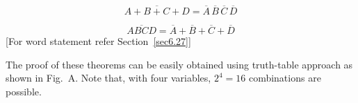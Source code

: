 \begin{solution}
~
\setcounter{thm}{0}
\begin{thm}
$$
\overline{A+B+C+D}=\overline{A}\,\overline{B}\,\overline{C}\,\overline{D}
$$
\end{thm}

\begin{thm}%
$$
\overline{ABCD}=\overline{A}+\overline{B}+\overline{C}+\overline{D}
$$
[For word statement refer Section~\ref{sec6.27}]
\end{thm}



The proof of these theorems can be easily obtained using truth-table approach as shown in Fig.~A. Note that, with four variables, $2^{4}=16$ combinations are possible.

\eject


\end{solution}
